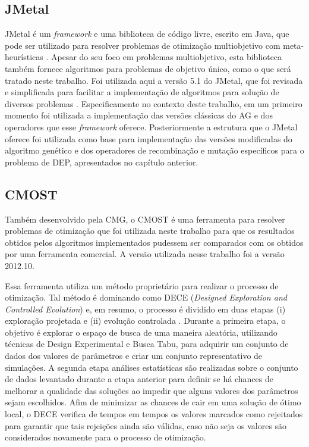 \subsection{JMetal}
\label{ch:4_JMetal}
JMetal é um \textit{framework} e uma biblioteca de código livre, escrito em Java, que pode ser utilizado para resolver problemas de otimização multiobjetivo com meta-heurísticas \cite{Durillo2011}. Apesar do seu foco em problemas multiobjetivo, esta biblioteca também fornece algoritmos para problemas de objetivo único, como o que será tratado neste trabalho. Foi utilizada aqui a versão 5.1 do JMetal, que foi revisada e simplificada para facilitar a implementação de algoritmos para solução de diversos problemas \cite{Nebro2015}. Especificamente no contexto deste trabalho, em um primeiro momento foi utilizada a implementação das versões clássicas do AG e dos operadores que esse \textit{framework} oferece. Posteriormente a estrutura que o JMetal oferece foi utilizada como base para implementação das versões modificadas do algoritmo genético e dos operadores de recombinação e mutação específicos para o problema de DEP, apresentados no capítulo anterior. 

\subsection{CMOST}
\label{ch:4_CMOST}
Também desenvolvido pela CMG, o CMOST é uma ferramenta para resolver problemas de otimização que foi utilizada neste trabalho para que os resultados obtidos pelos algoritmos implementados pudessem ser comparados com os obtidos por uma ferramenta comercial. A versão utilizada nesse trabalho foi a versão 2012.10.

Essa ferramenta utiliza um método proprietário para realizar o processo de otimização. Tal método é dominando como DECE (\textit{Designed Exploration and Controlled Evolution}) e, em resumo, o processo é dividido em duas etapas (i) exploração projetada e (ii) evolução controlada \cite{CMG2012}. Durante a primeira etapa, o objetivo é explorar o espaço de busca de uma maneira aleatória, utilizando técnicas de Design Experimental e Busca Tabu, para adquirir um conjunto de dados dos valores de parâmetros e criar um conjunto representativo de simulações. A segunda etapa análises estatísticas são realizadas sobre o conjunto de dados levantado durante a etapa anterior para definir se há chances de melhorar a qualidade das soluções ao impedir que alguns valores dos parâmetros sejam escolhidos. Afim de minimizar as chances de cair em uma solução de ótimo local, o DECE verifica de tempos em tempos os valores marcados como rejeitados para garantir que tais rejeições ainda são válidas, caso não seja os valores são considerados novamente para o processo de otimização.

